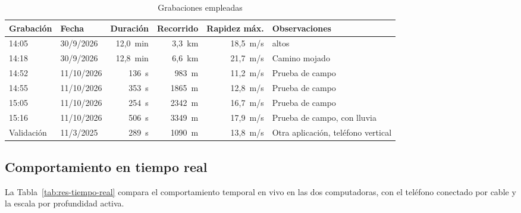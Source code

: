
\begin{table}[H]
\centering
\caption{Grabaciones empleadas}
\label{tab:res-grabaciones}
\small
\begin{tabularx}{\textwidth}{@{}l l r r r >{\raggedright\arraybackslash}X@{}}
\toprule
\textbf{Grabación} & \textbf{Fecha} & \textbf{Duración} & \textbf{Recorrido} & \textbf{Rapidez máx.} & \textbf{Observaciones} \\
\midrule
14:05 & 30/9/2026 & 12,0~min & 3,3~km & 18,5~m/s & 14 altos \\
14:18 & 30/9/2026 & 12,8~min & 6,6~km & 21,7~m/s & Camino mojado \\
14:52 & 11/10/2026 & 136~s & 983~m & 11,2~m/s & Prueba de campo \\
14:55 & 11/10/2026 & 353~s & 1865~m & 12,8~m/s & Prueba de campo \\
15:05 & 11/10/2026 & 254~s & 2342~m & 16,7~m/s & Prueba de campo \\
15:16 & 11/10/2026 & 506~s & 3349~m & 17,9~m/s & Prueba de campo, con lluvia \\
Validación & 11/3/2025 & 289~s & 1090~m & 13,8~m/s & Otra aplicación, teléfono vertical \\
\bottomrule
\end{tabularx}
\end{table}

\subsection{Comportamiento en tiempo real}
\label{sec:res-tiempo-real}

La Tabla~\ref{tab:res-tiempo-real} compara el comportamiento temporal en vivo en las dos computadoras, con el teléfono conectado por cable y la escala por profundidad activa.

